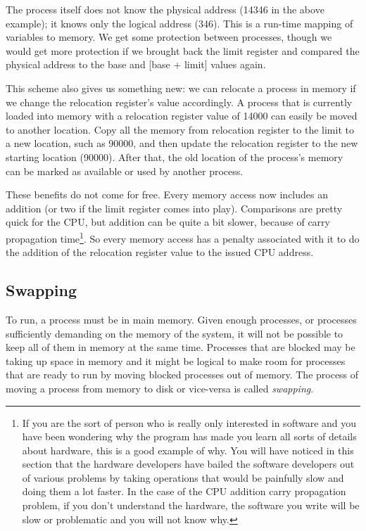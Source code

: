 The process itself does not know the physical address (14346 in the above example); it knows only the logical address (346). This is a run-time mapping of variables to memory.  We get some protection between processes, though we would get more protection if we brought back the limit register and compared the physical address to the base and [base + limit] values again. 

This scheme also gives us something new: we can relocate a process in memory if we change the relocation register's value accordingly. A process that is currently loaded into memory with a relocation register value of 14000 can easily be moved to another location. Copy all the memory from relocation register to the limit to a new location, such as 90000, and then update the relocation register to the new starting location (90000). After that, the old location of the process's memory can be marked as available or used by another process.

These benefits do not come for free. Every memory access now includes an addition (or two if the limit register comes into play). Comparisons are pretty quick for the CPU, but addition can be quite a bit slower, because of carry propagation time\footnote{If you are the sort of person who is really only interested in software and you have been wondering why the program has made you learn all sorts of details about hardware, this is a good example of why. You will have noticed in this section that the hardware developers have bailed the software developers out of various problems by taking operations that would be painfully slow and doing them a lot faster. In the case of the CPU addition carry propagation problem, if you don't understand the hardware, the software you write will be slow or problematic and you will not know why.}. So every memory access has a penalty associated with it to do the addition of the relocation register value to the issued CPU address. 

\subsection*{Swapping}

To run, a process must be in main memory. Given enough processes, or processes sufficiently demanding on the memory of the system, it will not be possible to keep all of them in memory at the same time. Processes that are blocked may be taking up space in memory and it might be logical to make room for processes that are ready to run by moving blocked processes out of memory. The process of moving a process from memory to disk or vice-versa is called \textit{swapping}.

